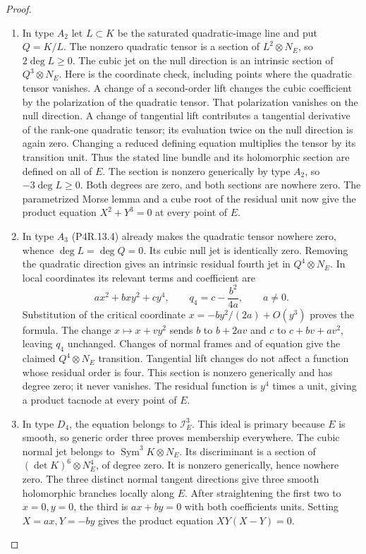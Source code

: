 \begin{proof}
\begin{enumerate}[label={$\langle1\rangle$\arabic*.},leftmargin=*]
\item In type $A_2$ let $L\subset K$ be the saturated
quadratic-image line and put $Q=K/L$. The nonzero
quadratic tensor is a section of
$L^2\otimes N_E$, so $2\deg L\ge0$.
The cubic jet on the null direction is an
intrinsic section of $Q^3\otimes N_E$.
Here is the coordinate check, including points
where the quadratic tensor vanishes. A change
of a second-order lift changes the cubic
coefficient by the polarization of the
quadratic tensor. That polarization vanishes
on the null direction. A change of tangential
lift contributes a tangential derivative of
the rank-one quadratic tensor; its evaluation
twice on the null direction is again zero.
Changing a reduced defining equation multiplies
the tensor by its transition unit. Thus the
stated line bundle and its holomorphic section
are defined on all of $E$. The section is
nonzero generically by type $A_2$, so
$-3\deg L\ge0$. Both degrees are zero,
and both sections are nowhere zero. The
parametrized Morse lemma and a cube root
of the residual unit now give the product
equation $X^2+Y^3=0$ at every point of $E$.

\item In type $A_3$ (P4R.13.4) already makes the
quadratic tensor nowhere zero, whence
$\deg L=\deg Q=0$. Its cubic null jet is
identically zero. Removing the quadratic
direction gives an intrinsic residual fourth
jet in $Q^4\otimes N_E$. In local coordinates
its relevant terms and coefficient are
\[
 a x^2+bxy^2+cy^4,
 \qquad q_4=c-\frac{b^2}{4a},\qquad a\ne0.                 \tag{P4R.13.5}
\]
Substitution of the critical coordinate
$x=-by^2/(2a)+O(y^3)$ proves the formula.
The change $x\mapsto x+vy^2$ sends $b$ to
$b+2av$ and $c$ to $c+bv+av^2$, leaving
$q_4$ unchanged. Changes of normal frames
and of equation give the claimed
$Q^4\otimes N_E$ transition. Tangential
lift changes do not affect a function
whose residual order is four. This section
is nonzero generically and has degree zero;
it never vanishes. The residual function
is $y^4$ times a unit, giving a product
tacnode at every point of $E$.

\item In type $D_4$, the equation belongs to
$\mathcal I_E^3$. This ideal is primary
because $E$ is smooth, so generic order
three proves membership everywhere.
The cubic normal jet belongs to
$\operatorname{Sym}^3K\otimes N_E$.
Its discriminant is a section of
$(\det K)^6\otimes N_E^4$, of degree
zero. It is nonzero generically, hence
nowhere zero. The three distinct normal
tangent directions give three smooth
holomorphic branches locally along $E$.
After straightening the first two to
$x=0,y=0$, the third is $ax+by=0$
with both coefficients units. Setting
$X=ax,Y=-by$ gives the product equation
$XY(X-Y)=0$.


\end{enumerate}
\end{proof}
